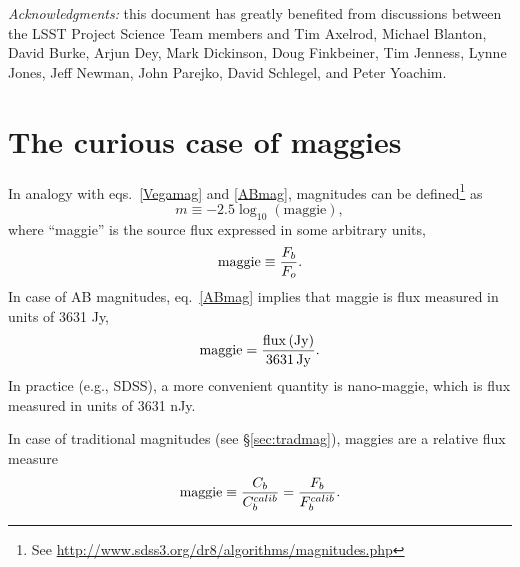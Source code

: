\documentclass[PST,toc]{lsstdoc}
\begin{document}
\vskip 0.0in
\newpage
\textit{Acknowledgments:} this document has greatly benefited from discussions between
the LSST Project Science Team members and Tim Axelrod, Michael Blanton, David
Burke, Arjun Dey, Mark Dickinson, Doug Finkbeiner, Tim Jenness, Lynne Jones,  Jeff Newman,
John Parejko, David Schlegel, and Peter Yoachim.



\appendix

\section{The curious case of maggies}

In analogy with eqs.~\ref{Vegamag} and \ref{ABmag}, magnitudes can be defined\footnote{
See \url{http://www.sdss3.org/dr8/algorithms/magnitudes.php}} as
\begin{equation}
\label{maggie}
               m \equiv - 2.5\log_{10}\left(\mathrm{maggie}\right),
\end{equation}
where ``maggie'' is the source flux expressed in some arbitrary
units,
\begin{equation}
\label{maggie2}
               \mathrm{maggie} \equiv {F_b \over F_o}.
\end{equation}
In case of AB magnitudes, eq.~\ref{ABmag} implies that maggie is
flux measured in units of 3631 Jy,
\begin{equation}
\label{eq:defmaggie}
           \mathrm{maggie} = {\mathrm{flux \, (Jy)} \over \mathrm{3631 \, Jy}}.
\end{equation}
In practice (e.g., SDSS), a more convenient
quantity is nano-maggie, which is flux measured in units of 3631 nJy.

In case of traditional magnitudes (see \S\ref{sec:tradmag}), maggies are a
relative flux measure
\begin{equation}
\label{maggie3}
    \mathrm{maggie} \equiv {C_b  \over C_b^{calib}} = {F_b  \over F_b^{calib}}.
\end{equation}
\end{document}
